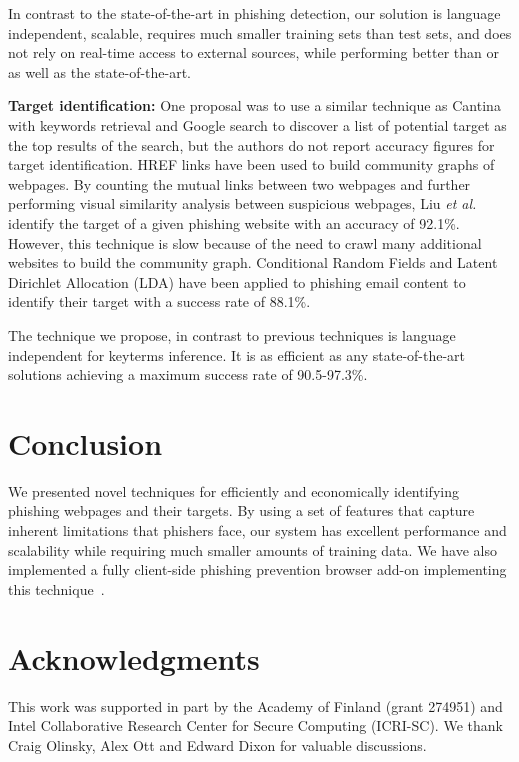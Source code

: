 \documentclass[10pt,conference,compsocconf,letterpaper]{IEEEtran}
\begin{document}
In contrast to the state-of-the-art in phishing detection, our solution is language independent, scalable, requires much smaller training sets than test sets, and does not rely on real-time access to external sources, while performing better than or as well as the state-of-the-art.



\textbf{Target identification:}
One proposal \cite{ramesh:2014:efficious} was to use a similar technique as Cantina with keywords retrieval and Google search to discover a list of potential target as the top results of the search, but the authors do not report accuracy figures for target identification.
HREF links have been used to build community graphs of webpages. By counting the mutual links between two webpages and further performing visual similarity analysis between suspicious webpages, Liu \textit{et al.} \cite{liu:2012:anti} identify the target of a given phishing website with an accuracy of 92.1\%. However, this technique is slow because of the need to crawl many additional websites to build the community graph.
Conditional Random Fields and Latent Dirichlet Allocation (LDA) \cite{blei:2003:latent} have been applied to phishing email content to identify their target \cite{ramanathan:2013:phishing} with a success rate of 88.1\%.

The technique we propose, in contrast to previous techniques is language independent for keyterms inference. It is as efficient as any state-of-the-art solutions achieving a maximum success rate of 90.5-97.3\%.
\fi

\section{Conclusion}
We presented novel techniques for efficiently and economically
identifying phishing webpages and their targets. By using a set of
features that capture inherent limitations that phishers face, our
system has excellent performance and scalability while requiring much
smaller amounts of training data. We have also implemented a fully client-side phishing prevention 
browser add-on implementing this technique~\cite{armano:2016:real}.

\section{Acknowledgments}
This work was supported in part by the Academy of Finland (grant
274951) and Intel Collaborative Research Center for Secure Computing
(ICRI-SC). We thank Craig Olinsky, Alex Ott and Edward Dixon for
valuable discussions.
\end{document}
